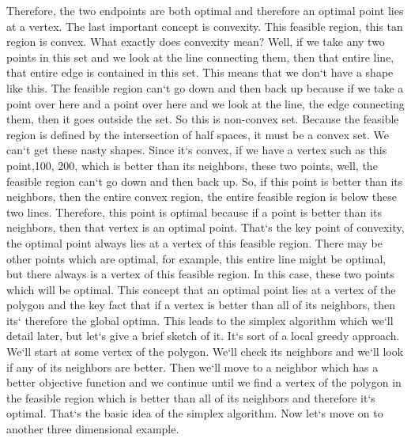 Therefore, the two endpoints are both optimal and therefore an optimal point lies at a vertex.
The last important concept is convexity.
This feasible region, this tan region is convex.
What exactly does convexity mean? Well, if we take any two points in this set and we look at the line connecting them, then that entire line, that entire edge is contained in this set.
This means that we don`t have a shape like this.
The feasible region can`t go down and then back up because if we take a point over here and a point over here and we look at the line, the edge connecting them, then it goes outside the set.
So this is non-convex set.
Because the feasible region is defined by the intersection of half spaces, it must be a convex set.
We can`t get these nasty shapes.
Since it`s convex, if we have a vertex such as this point,100, 200, which is better than its neighbors, these two points, well, the feasible region can`t go down and then back up.
So, if this point is better than its neighbors, then the entire convex region, the entire feasible region is below these two lines.
Therefore, this point is optimal because if a point is better than its neighbors, then that vertex is an optimal point.
That`s the key point of convexity, the optimal point always lies at a vertex of this feasible region.
There may be other points which are optimal, for example, this entire line might be optimal, but there always is a vertex of this feasible region.
In this case, these two points which will be optimal.
This concept that an optimal point lies at a vertex of the polygon and the key fact that if a vertex is better than all of its neighbors, then its` therefore the global optima.
This leads to the simplex algorithm which we`ll detail later, but let`s give a brief sketch of it.
It`s sort of a local greedy approach.
We`ll start at some vertex of the polygon.
We`ll check its neighbors and we`ll look if any of its neighbors are better.
Then we`ll move to a neighbor which has a better objective function and we continue until we find a vertex of the polygon in the feasible region which is better than all of its neighbors and therefore it`s optimal.
That`s the basic idea of the simplex algorithm.
Now let`s move on to another three dimensional example.

